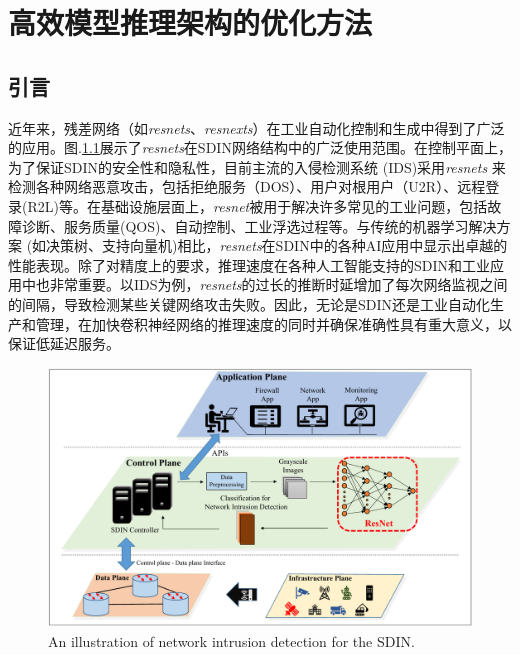 
\chapter{高效模型推理架构的优化方法}

\section{引言}

近年来，残差网络（如\emph{resnets}、\emph{resnexts}）在工业自动化控制和生成中得到了广泛的应用。图.\ref{NIDS}展示了\emph{resnets}在SDIN网络结构中的广泛使用范围。在控制平面上，为了保证SDIN的安全性和隐私性，目前主流的入侵检测系统 (IDS)采用\emph{resnets} \cite{masum2021transfer,song2020real,man2021residual}来检测各种网络恶意攻击，包括拒绝服务（DOS）、用户对根用户（U2R）、远程登录(R2L)等。在基础设施层面上，\emph{resnet}被用于解决许多常见的工业问题，包括故障诊断\cite{8850096}、服务质量(QOS)、自动控制\cite{9166726}、工业浮选过程\cite{9166726,FU2019183}等。与传统的机器学习解决方案 (如决策树、支持向量机)相比，\emph{resnets}在SDIN中的各种AI应用中显示出卓越的性能表现。除了对精度上的要求，推理速度在各种人工智能支持的SDIN和工业应用中也非常重要。以IDS为例，\emph{resnets}的过长的推断时延增加了每次网络监视之间的间隔，导致检测某些关键网络攻击失败。因此，无论是SDIN还是工业自动化生产和管理，在加快卷积神经网络的推理速度的同时并确保准确性具有重大意义，以保证低延迟服务\cite{8850096,9173723,9187678,9173697}。
\begin{figure}[ht]
	\centering
	\includegraphics[width=1\textwidth]{figures/Jresnet/FIG1_TII-21-2603.pdf}
	\caption{An illustration of network intrusion detection for the SDIN.}
	\label{NIDS}
\end{figure}


